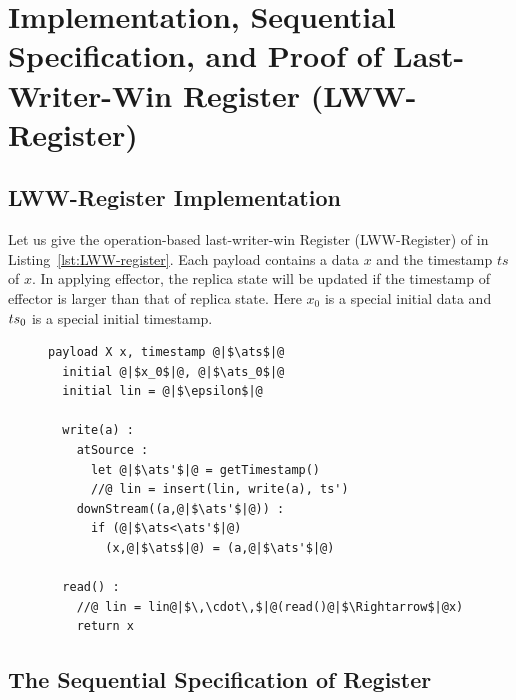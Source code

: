\section{Implementation, Sequential Specification, and Proof of Last-Writer-Win Register (LWW-Register)}
\label{sec:implementation, sequential specification, and proof of last-writer-win register (LWW-register)}



\subsection{LWW-Register Implementation}
\label{subsec:LWW-register implementation}

Let us give the operation-based last-writer-win Register (LWW-Register) of \cite{ShapiroPBZ11} in Listing~\ref{lst:LWW-register}. Each payload contains a data $x$ and the timestamp $ts$ of $x$. In applying effector, the replica state will be updated if the timestamp of effector is larger than that of replica state. Here $x_0$ is a special initial data and $ts_0$ is a special initial timestamp.


\begin{figure}[t]
\begin{lstlisting}[frame=top,caption={Pseudo-code of LWW-register},
captionpos=b,label={lst:LWW-register}]
  payload X x, timestamp @|$\ats$|@
  initial @|$x_0$|@, @|$\ats_0$|@
  initial lin = @|$\epsilon$|@

  write(a) :
    atSource :
      let @|$\ats'$|@ = getTimestamp()
      //@ lin = insert(lin, write(a), ts')
    downStream((a,@|$\ats'$|@)) :
      if (@|$\ats<\ats'$|@)
        (x,@|$\ats$|@) = (a,@|$\ats'$|@)

  read() :
    //@ lin = lin@|$\,\cdot\,$|@(read()@|$\Rightarrow$|@x)
    return x
\end{lstlisting}
\end{figure}



\subsection{The Sequential Specification of Register}
\label{subsec:the sequential specification of register}

